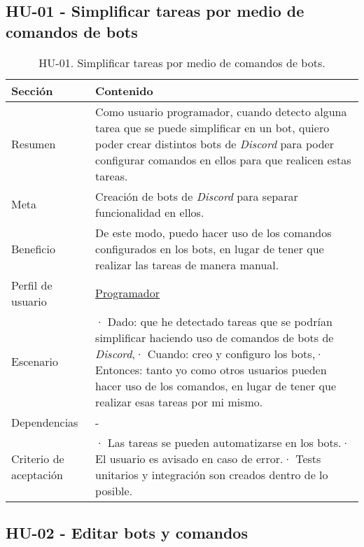 \subsection{HU-01 - Simplificar tareas por medio de comandos de bots}
\label{sec:hu01}

\begin{table}[H]
    \centering
    \def\arraystretch{1.25}
    \begin{adjustbox}{max width=\textwidth}
    \begin{tabularx}{\textwidth}{|l|L|}
    \hline
        \textbf{Sección} & \textbf{Contenido} \\ \hline
    \hline
        Resumen & Como usuario programador, cuando detecto alguna tarea que se puede simplificar en un bot, quiero poder crear distintos bots de \textit{Discord} para poder configurar comandos en ellos para que realicen estas tareas. \\ \hline
        Meta & Creación de bots de \textit{Discord} para separar funcionalidad en ellos. \\ \hline
        Beneficio & De este modo, puedo hacer uso de los comandos configurados en los bots, en lugar de tener que realizar las tareas de manera manual. \\ \hline
        Perfil de usuario & \hyperref[sec:personaProgramador]{Programador} \\ \hline
        Escenario & · Dado: que he detectado tareas que se podrían simplificar haciendo uso de comandos de bots de \textit{Discord},\linebreak · Cuando: creo y configuro los bots,\linebreak · Entonces: tanto yo como otros usuarios pueden hacer uso de los comandos, en lugar de tener que realizar esas tareas por mi mismo. \\ \hline
        Dependencias & - \\ \hline
        Criterio de aceptación & · Las tareas se pueden automatizarse en los bots.\linebreak · El usuario es avisado en caso de error.\linebreak · Tests unitarios y integración son creados dentro de lo posible. \\ \hline
    \end{tabularx}
    \end{adjustbox}
    \caption{HU-01. Simplificar tareas por medio de comandos de bots.}
\end{table}


\subsection{HU-02 - Editar bots y comandos}
\label{sec:hu02}


